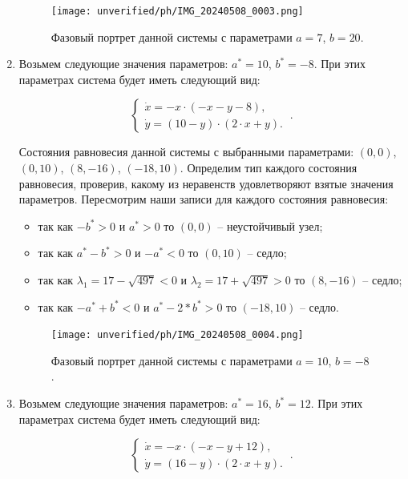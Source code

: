 \begin{enumerate}
\begin{figure}[!thb]
\texttt{[image: unverified/ph/IMG\_20240508\_0003.png]}
\centering
\caption{\label{fig:bifdiag2} Фазовый портрет данной системы с параметрами $a = 7$, $b = 20$.}
\end{figure}

\newpage
\item

Возьмем следующие значения параметров:  $a^\ast = 10$, $b^\ast = -8$. При этих параметрах система будет иметь следующий вид: 

$$
\left \lbrace 
\begin{matrix} 
\dot{x} = -x \cdot (-x - y - 8), \\
\dot{y} = (10 - y) \cdot (2 \cdot x + y). \
\end{matrix} 
\right . .$$

Состояния равновесия данной системы с выбранными параметрами: $(0, 0)$, $(0, 10)$, $(8, -16)$, $(-18, 10)$. Определим тип каждого состояния равновесия, проверив, какому из неравенств удовлетворяют взятые значения параметров.  Пересмотрим наши записи для каждого состояния равновесия: 
\begin{itemize}
\item{ так как $-b^\ast > 0 $ и $a^\ast > 0 $ то $(0, 0)$ -- неустойчивый узел;}
\item{ так как $a^\ast - b^\ast > 0 $ и $-a^\ast  < 0 $ то $(0, 10)$ -- седло;}
\item{ так как ${\lambda_{1}} = 17 - \sqrt{497}  < 0 $ и ${\lambda_{2}} = 17 + \sqrt{497} > 0 $ то $(8, -16)$ -- седло;}
\item{ так как $-a^\ast + b^\ast  < 0 $ и $a^\ast - 2*b^\ast > 0 $ то $(-18, 10)$ -- седло.}
\end{itemize} 

\begin{figure}[!thb]
\texttt{[image: unverified/ph/IMG\_20240508\_0004.png]}
\centering
\caption{\label{fig:bifdiag2} Фазовый портрет данной системы с параметрами $a = 10$, $b = -8$.}
\end{figure}
\newpage
\item

Возьмем следующие значения параметров:  $a^\ast = 16$, $b^\ast = 12$. При этих параметрах система будет иметь следующий вид: 

$$
\left \lbrace 
\begin{matrix} 
\dot{x} = -x \cdot (-x - y + 12), \\
\dot{y} = (16 - y) \cdot (2 \cdot x + y). \
\end{matrix} 
\right . .$$


\end{enumerate}
